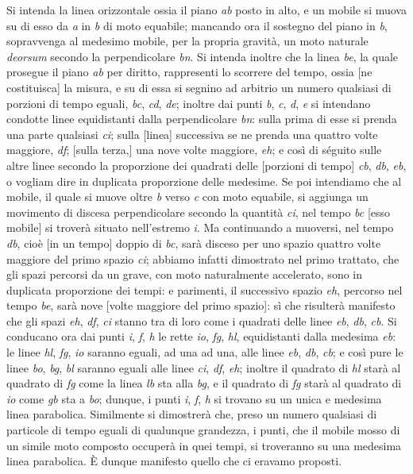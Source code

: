 \documentclass[11pt,twoside,openany]{book}
\begin{document}
Si intenda la linea orizzontale ossia il piano \emph{ab} posto in alto, e un mobile si muova su di esso da \emph{a} in \emph{b} di moto equabile; mancando ora il sostegno del piano in \emph{b}, sopravvenga al medesimo mobile, per la propria gravità, un moto naturale \emph{deorsum} secondo la perpendicolare \emph{bn}. Si intenda inoltre che la linea \emph{be}, la quale prosegue il piano \emph{ab} per diritto, rappresenti lo scorrere del tempo, ossia [ne costituisca] la misura, e su di essa si segnino ad arbitrio un numero qualsiasi di porzioni di tempo eguali, \emph{bc}, \emph{cd}, \emph{de}; inoltre dai punti \emph{b}, \emph{c}, \emph{d}, \emph{e} si intendano condotte linee equidistanti dalla perpendicolare \emph{bn}: sulla prima di esse si prenda una parte qualsiasi \emph{ci}; sulla [linea] successiva se ne prenda una quattro volte maggiore, \emph{df}; [sulla terza,] una nove volte maggiore, \emph{eh}; e così di séguito sulle altre linee secondo la proporzione dei quadrati delle [porzioni di tempo] \emph{cb}, \emph{db}, \emph{eb}, o vogliam dire in duplicata proporzione delle medesime. Se poi intendiamo che al mobile, il quale si muove oltre \emph{b} verso \emph{c} con moto equabile, si aggiunga un movimento di discesa perpendicolare secondo la quantità \emph{ci}, nel tempo \emph{bc} [esso mobile] si troverà situato nell'estremo \emph{i}. Ma continuando a muoversi, nel tempo \emph{db}, cioè [in un tempo] doppio di \emph{bc}, sarà disceso per uno spazio quattro volte maggiore del primo spazio \emph{ci}; abbiamo infatti dimostrato nel primo trattato, che gli spazi percorsi da un grave, con moto naturalmente accelerato, sono in duplicata proporzione dei tempi: e parimenti, il successivo spazio \emph{eh}, percorso nel tempo \emph{be}, sarà nove [volte maggiore del primo spazio]: sì che risulterà manifesto che gli spazi \emph{eh}, \emph{df}, \emph{ci} stanno tra di loro come i quadrati delle linee \emph{eb}, \emph{db}, \emph{cb}. Si conducano ora dai punti \emph{i}, \emph{f}, \emph{h} le rette \emph{io}, \emph{fg}, \emph{hl}, equidistanti dalla medesima \emph{eb}: le linee \emph{hl}, \emph{fg}, \emph{io} saranno eguali, ad una ad una, alle linee \emph{eb}, \emph{db}, \emph{cb}; e così pure le linee \emph{bo}, \emph{bg}, \emph{bl} saranno eguali alle linee \emph{ci}, \emph{df}, \emph{eh}; inoltre il quadrato di \emph{hl} starà al quadrato di \emph{fg} come la linea \emph{lb} sta alla \emph{bg}, e il quadrato di \emph{fg} starà al quadrato di \emph{io} come \emph{gb} sta a \emph{bo}; dunque, i punti \emph{i}, \emph{f}, \emph{h} si trovano su un unica e medesima linea parabolica. Similmente si dimostrerà che, preso un numero qualsiasi di particole di tempo eguali di qualunque grandezza, i punti, che il mobile mosso di un simile moto composto occuperà in quei tempi, si troveranno su una medesima linea parabolica. È dunque manifesto quello che ci eravamo proposti.
\end{document}
